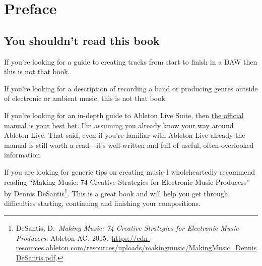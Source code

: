 \documentclass[
  12pt,
  letterpaper,
  oneside,
  open=any]{scrbook}
\renewcommand*\contentsname{Table of contents}
\newcommand\contentsname{Table of contents}
\begin{document}

\renewcommand*\contentsname{Chapters}
{
\hypersetup{linkcolor=}
\setcounter{tocdepth}{1}
\tableofcontents
}
\mainmatter
{}

\chapter*{}\label{section}

\markboth{}{}


\chapter*{Preface}\label{000-Preface}


\section*{You shouldn't read this
book}\label{you-shouldnt-read-this-book}


If you're looking for a guide to creating tracks from start to finish in
a DAW then this is not that book.

If you're looking for a description of recording a band or producing
genres outside of electronic or ambient music, this is not that book.

If you're looking for an in-depth guide to Ableton Live Suite, then
\href{https://www.ableton.com/en/manual/welcome-to-live/}{the official
manual is your best bet}. I'm assuming you already know your way around
Ableton Live. That said, even if you're familiar with Ableton Live
already the manual is still worth a read---it's well-written and full of
useful, often-overlooked information.

If you are looking for generic tips on creating music I wholeheartedly
recommend reading ``Making Music: 74 Creative Strategies for Electronic
Music Producers'' by Dennis DeSantis\footnote{DeSantis, D.~\emph{Making
  Music: 74 Creative Strategies for Electronic Music Producers}. Ableton
  AG,
  2015.~\url{https://cdn-resources.ableton.com/resources/uploads/makingmusic/MakingMusic_DennisDeSantis.pdf}.}.
This is a great book and will help you get through difficulties
starting, continuing and finishing your compositions.
\end{document}
